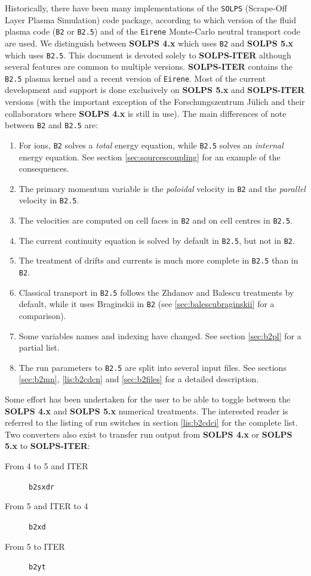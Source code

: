 \documentclass[a4paper,10pt]{report}
\newcommand\SOLPSfour{{\bf SOLPS 4.x} }
\newcommand\SOLPSfive{{\bf SOLPS 5.x} }
\newcommand\SOLPSITER{{\bf SOLPS-ITER} }
\newcommand\SOLPSITERns{{\bf SOLPS-ITER}}
\begin{document}
Historically, there have been many implementations of the
{\tt SOLPS} (Scrape-Off Layer Plasma Simulation) code package, according
to which version of the fluid plasma code ({\tt B2} or {\tt B2.5}) and of
the {\tt Eirene} Monte-Carlo neutral transport code are used. We distinguish
between \SOLPSfour which uses {\tt B2} and \SOLPSfive which uses {\tt B2.5}.
This document is devoted solely to \SOLPSITER although several features are
common to multiple versions. \SOLPSITER contains the {\tt B2.5} plasma kernel and a recent version of {\tt Eirene}.
Most of the current development and support
is done exclusively on \SOLPSfive and \SOLPSITER versions (with the important exception of the Forschungszentrum J{\"u}lich and their collaborators where \SOLPSfour is still in use). The main
differences of note between {\tt B2} and {\tt B2.5} are:
\begin{enumerate}
  \item For ions, {\tt B2} solves a {\em total} energy equation, while {\tt B2.5}
solves an {\em internal} energy equation. See section \ref{sec:sourcescoupling} for an
example of the consequences.
  \item The primary momentum variable is the {\em poloidal} velocity in {\tt B2} and the
{\em parallel} velocity in {\tt B2.5}.
  \item The velocities are computed on cell faces in {\tt B2} and on cell centres in {\tt B2.5}.
  \item The current continuity equation is solved by default in {\tt B2.5}, but not in {\tt B2}.
  \item The treatment of drifts and currents is much more complete in {\tt B2.5} than in {\tt B2}.
  \item Classical transport in {\tt B2.5} follows the Zhdanov and Balescu treatments by default, while it uses
Braginskii in {\tt B2} (see \ref{sec:balescubraginskii} for a comparison).
  \item Some variables names and indexing have changed. See section \ref{sec:b2pl} for a partial list.
  \item The run parameters to {\tt B2.5} are split into several input files. See sections
\ref{sec:b2mn}, \ref{lis:b2cdcn} and \ref{sec:b2files} for a detailed description.
\end{enumerate}
Some effort has been undertaken for the user to be able to toggle between the \SOLPSfour and
\SOLPSfive numerical treatments. The interested reader is referred to the listing of run switches
in section \ref{lis:b2cdci} for the complete list. Two converters also exist to transfer run output
from \SOLPSfour or \SOLPSfive to \SOLPSITERns:
\begin{description}
  \item[From 4 to 5 and ITER] {\tt b2sxdr}
  \item[From 5 and ITER to 4] {\tt b2xd}
  \item[From 5 to ITER] {\tt b2yt}
\end{description}
\end{document}
